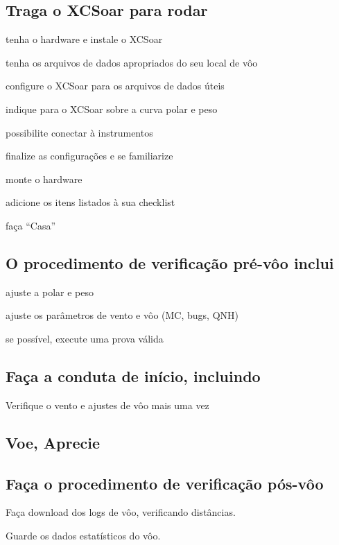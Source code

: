 \documentclass[a4paper,12pt]{refrep}
\begin{document}
\subsection{\textcolor{flashblue}{Traga o XCSoar para rodar}}
\begin{compactitem}
\item tenha o hardware e instale o XCSoar
\item tenha os arquivos de dados apropriados do seu local de vôo
\item configure o XCSoar para os arquivos de dados úteis
\item indique para o XCSoar sobre a curva polar e peso
\item possibilite conectar à instrumentos
\item finalize as configurações e se familiarize
\item monte o hardware
\item adicione os itens listados à sua checklist
\item faça ``Casa''
\end{compactitem}

\subsection*{\textcolor{flashblue}{O procedimento de verificação pré-vôo inclui}}
\begin{compactitem}
\item ajuste a polar e peso
\item ajuste os parâmetros de vento e vôo (MC, bugs,  QNH)
\item se possível, execute uma prova válida
\end{compactitem}

\subsection*{\textcolor{flashblue}{Faça a conduta de início, incluindo}}
\begin{compactitem}
\item Verifique o vento e ajustes de vôo mais uma vez
\end{compactitem}

\subsection*{\textcolor{flashblue}{Voe, Aprecie}}

\subsection*{\textcolor{flashblue}{Faça o procedimento de verificação pós-vôo}}
\begin{compactitem}
\item Faça download dos logs de vôo, verificando distâncias.
\item Guarde os dados estatísticos do vôo.
\end{compactitem}
\end{document}
